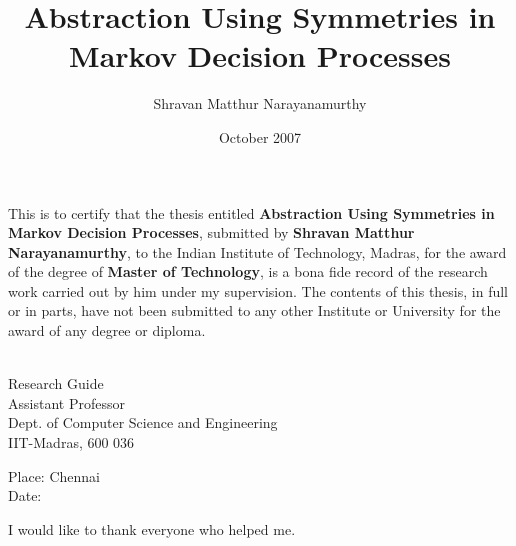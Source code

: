 \documentclass[MTech]{iitmdiss}
\def\thesistitle{Abstraction Using Symmetries in Markov Decision Processes}
\def\thesisauthor{Shravan Matthur Narayanamurthy}
\begin{document}


\title{\thesistitle}

\author{\thesisauthor}

\date{October 2007}

\begin{singlespace}
\maketitle 
\end{singlespace} 



\certificate

\vspace*{0.5in}

\noindent This is to certify that the thesis entitled {\bf {\thesistitle}}, 
submitted by {\bf {\thesisauthor}}, to the Indian Institute of Technology, 
Madras, for the award of the degree of {\bf Master of Technology}, 
is a bona fide record of the research work carried out by him under my
supervision. The contents of this thesis, in full or in parts, have not been
submitted to any other Institute or University for the award of any degree or
diploma.

\vspace*{1.4in}
\hspace*{-0.25in}
\begin{singlespace}
 \\
\noindent Research Guide \\ 
\noindent Assistant Professor \\
\noindent Dept. of Computer Science and Engineering\\
\noindent IIT-Madras, 600 036 \\
\end{singlespace}
\vspace*{0.20in}
\noindent Place: Chennai\\ 
Date:

\acknowledgements

I would like to thank everyone who helped me.

\end{document}
